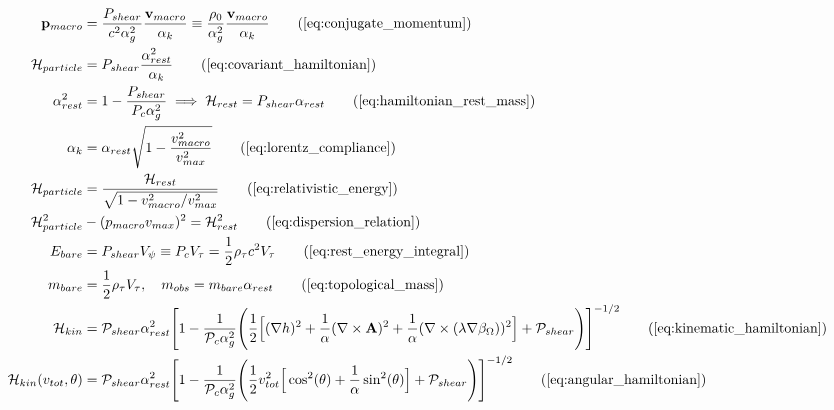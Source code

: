 \begin{tcolorbox}[recallbox, title={\ref{box:legendre_hamiltonian}. The Legendre Hamiltonian Translation}]
\begin{align}
    \mathbf{p}_{macro} &= \frac{P_{shear}}{c^2 \alpha_g^2} \frac{\mathbf{v}_{macro}}{\alpha_k} \equiv \frac{\rho_0}{\alpha_g^2} \frac{\mathbf{v}_{macro}}{\alpha_k} \tag{\ref{eq:conjugate_momentum}} \\
    \mathcal{H}_{particle} &= P_{shear} \frac{\alpha_{rest}^2}{\alpha_k} \tag{\ref{eq:covariant_hamiltonian}} \\
    \alpha_{rest}^2 &= 1 - \frac{P_{shear}}{P_c \alpha_g^2} \implies \mathcal{H}_{rest} = P_{shear} \alpha_{rest} \tag{\ref{eq:hamiltonian_rest_mass}} \\
    \alpha_k &= \alpha_{rest} \sqrt{1 - \frac{v_{macro}^2}{v_{max}^2}} \tag{\ref{eq:lorentz_compliance}} \\
    \mathcal{H}_{particle} &= \frac{\mathcal{H}_{rest}}{\sqrt{1 - v_{macro}^2/v_{max}^2}} \tag{\ref{eq:relativistic_energy}} \\
    \mathcal{H}_{particle}^2 &- (p_{macro} v_{max})^2 = \mathcal{H}_{rest}^2 \tag{\ref{eq:dispersion_relation}} \\
    E_{bare} &= P_{shear} V_{\psi} \equiv P_c V_{\tau} = \frac{1}{2}\rho_\tau c^2 V_{\tau} \tag{\ref{eq:rest_energy_integral}} \\
    m_{bare} &= \frac{1}{2}\rho_\tau V_{\tau}, \quad m_{obs} = m_{bare} \alpha_{rest} \tag{\ref{eq:topological_mass}} \\
    \mathcal{H}_{kin} &= \mathcal{P}_{shear} \alpha_{rest}^2 \Bigg[ 1 - \frac{1}{\mathcal{P}_c \alpha_g^2} \Bigg( \frac{1}{2} \Big[ (\nabla h)^2  + \frac{1}{\alpha}(\nabla \times \mathbf{A})^2 + \frac{1}{\alpha}(\nabla \times (\lambda \nabla \beta_\Omega))^2 \Big] + \mathcal{P}_{shear} \Bigg) \Bigg]^{-1/2} \tag{\ref{eq:kinematic_hamiltonian}} \\
    \mathcal{H}_{kin}(v_{tot}, \theta) &= \mathcal{P}_{shear} \alpha_{rest}^2 \Bigg[ 1 - \frac{1}{\mathcal{P}_c \alpha_g^2} \Bigg( \frac{1}{2} v_{tot}^2 \Big[ \cos^2(\theta) + \frac{1}{\alpha}\sin^2(\theta) \Big] + \mathcal{P}_{shear} \Bigg) \Bigg]^{-1/2} \tag{\ref{eq:angular_hamiltonian}}
\end{align}
\end{tcolorbox}







